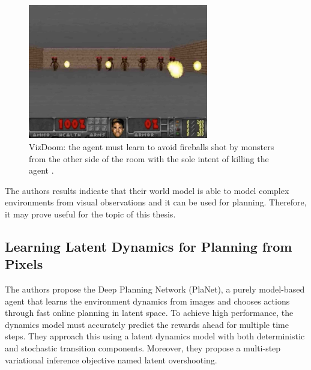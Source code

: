 \begin{figure}[H]
\includegraphics[width=0.7\textwidth,keepaspectratio]{figures/VizDoom.png}
\caption[VizDoom]{VizDoom: the agent must learn to avoid fireballs shot by monsters from the other side of the room with the sole intent of killing the agent \protect\cite{Algo.WorldModels}.}
\label{Fig.VizDoom}
\end{figure}

The authors results indicate that their world model is able to model complex environments from visual observations and it can be used for planning. Therefore, it may prove useful for the topic of this thesis.

\subsection{Learning Latent Dynamics for Planning from Pixels}

The authors propose the Deep Planning Network \cite{Algo.PlaNet} (PlaNet), a purely model-based agent that learns the environment dynamics from images and chooses actions through fast online planning in latent space. To achieve high performance, the dynamics model must accurately predict the rewards ahead for multiple time steps. They approach this using a latent dynamics model with both deterministic and stochastic transition components. Moreover, they propose a multi-step variational inference objective named latent overshooting.

